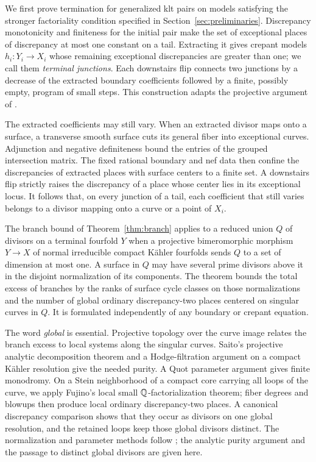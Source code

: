 We first prove termination for generalized klt pairs on models satisfying the stronger factoriality condition specified in Section~\ref{sec:preliminaries}. Discrepancy monotonicity and finiteness for the initial pair make the set of exceptional places of discrepancy at most one constant on a tail. Extracting it gives crepant models \(h_i:Y_i\to X_i\) whose remaining exceptional discrepancies are greater than one; we call them \emph{terminal junctions}. Each downstairs flip connects two junctions by a decrease of the extracted boundary coefficients followed by a finite, possibly empty, program of small steps. This construction adapts the projective argument of \cite[Section~3, Proposition~3.4]{ProjectiveLCFourfolds}.

The extracted coefficients may still vary. When an extracted divisor maps onto a surface, a transverse smooth surface cuts its general fiber into exceptional curves. Adjunction and negative definiteness bound the entries of the grouped intersection matrix. The fixed rational boundary and nef data then confine the discrepancies of extracted places with surface centers to a finite set. A downstairs flip strictly raises the discrepancy of a place whose center lies in its exceptional locus. It follows that, on every junction of a tail, each coefficient that still varies belongs to a divisor mapping onto a curve or a point of \(X_i\).

The branch bound of Theorem~\ref{thm:branch} applies to a reduced union \(Q\) of divisors on a terminal fourfold \(Y\) when a projective bimeromorphic morphism \(Y\to X\) of normal irreducible compact K\"ahler fourfolds sends \(Q\) to a set of dimension at most one. A surface in \(Q\) may have several prime divisors above it in the disjoint normalization of its components. The theorem bounds the total excess of branches by the ranks of surface cycle classes on those normalizations and the number of global ordinary discrepancy-two places centered on singular curves in \(Q\). It is formulated independently of any boundary or crepant equation.

The word \emph{global} is essential. Projective topology over the curve image relates the branch excess to local systems along the singular curves. Saito's projective analytic decomposition theorem and a Hodge-filtration argument on a compact K\"ahler resolution give the needed purity. A Quot parameter argument gives finite monodromy. On a Stein neighborhood of a compact core carrying all loops of the curve, we apply Fujino's local small \(\mathbb{Q}\)-factorialization theorem; fiber degrees and blowups then produce local ordinary discrepancy-two places. A canonical discrepancy comparison shows that they occur as divisors on one global resolution, and the retained loops keep those global divisors distinct. The normalization and parameter methods follow \cite[Sections~5--6]{ProjectiveLCFourfolds}; the analytic purity argument and the passage to distinct global divisors are given here.

